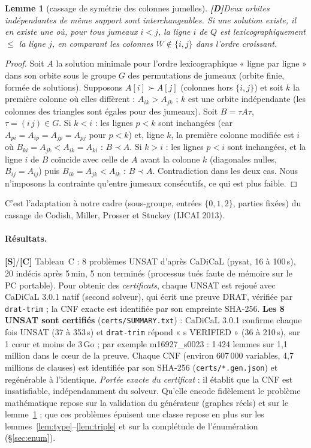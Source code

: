 \documentclass[11pt,a4paper]{article}
\newtheorem{lemma}[theorem]{Lemme}
\theoremstyle{remark}
\newcommand{\st}[1]{\textbf{[#1]}}
\newcommand{\code}[1]{\texttt{#1}}
\begin{document}
\begin{lemma}[cassage de symétrie des colonnes jumelles] \st{D}\label{lem:lex}
Deux orbites indépendantes de même support sont interchangeables. Si une solution existe, il en existe une où, pour tous jumeaux $i<j$,
la ligne $i$ de $Q$ est lexicographiquement $\le$ la ligne $j$, en comparant les colonnes $W\notin\{i,j\}$ dans l'ordre croissant.
\end{lemma}
\begin{proof}
Soit $A$ la solution minimale pour l'ordre lexicographique « ligne par ligne » dans son orbite sous le groupe $G$ des permutations de jumeaux
(orbite finie, formée de solutions). Supposons $A[i]\succ A[j]$ (colonnes hors $\{i,j\}$) et soit $k$ la première colonne où elles diffèrent :
$A_{ik}>A_{jk}$ ; $k$ est une orbite indépendante (les colonnes des triangles sont égales pour des jumeaux). Soit $B=\tau A\tau$, $\tau=(i\,j)\in G$.
Si $k<i$ : les lignes $p<k$ sont inchangées (car $A_{pi}=A_{ip}=A_{jp}=A_{pj}$ pour $p<k$) et, ligne $k$, la première colonne modifiée est $i$ où
$B_{ki}=A_{jk}<A_{ik}=A_{ki}$ : $B\prec A$. Si $k>i$ : les lignes $p<i$ sont inchangées, et la ligne $i$ de $B$ coïncide avec celle de $A$ avant la colonne $k$
(diagonales nulles, $B_{ij}=A_{ij}$) puis $B_{ik}=A_{jk}<A_{ik}$ : $B\prec A$. Contradiction dans les deux cas.
Nous n'imposons la contrainte qu'entre jumeaux consécutifs, ce qui est plus faible.
\end{proof}
C'est l'adaptation à notre cadre (sous-groupe, entrées $\{0,1,2\}$, parties fixées) du cassage de Codish, Miller, Prosser et Stuckey (IJCAI 2013).

\paragraph{Résultats.} \st{S}/\st{C} Tableau~C : 8 problèmes UNSAT d'après CaDiCaL (pysat, 16 à 100\,s), 20 indécis après 5\,min, 5 non terminés
(processus tués faute de mémoire sur le PC portable). Pour obtenir des \emph{certificats}, chaque UNSAT est rejoué avec CaDiCaL 3.0.1 natif (second solveur),
qui écrit une preuve DRAT, vérifiée par \code{drat-trim} ; la CNF exacte est identifiée par son empreinte SHA-256.
\textbf{Les 8 UNSAT sont certifiés} (\code{certs/SUMMARY.txt}) : CaDiCaL 3.0.1 confirme chaque fois UNSAT (37 à 353\,s) et \code{drat-trim} répond
« s VERIFIED » (36 à 210\,s), sur 1 cœur et moins de 3\,Go ; par exemple m16927\_s0023 : 1\,424 lemmes sur 1,1 million dans le cœur de la preuve.
Chaque CNF (environ 607\,000 variables, 4,7 millions de clauses) est identifiée par son SHA-256 (\code{certs/*.gen.json}) et regénérable à l'identique.
\emph{Portée exacte du certificat} : il établit que la CNF est insatisfiable, indépendamment du solveur. Qu'elle encode fidèlement le problème mathématique
repose sur la validation du générateur (graphes réels) et sur le lemme~\ref{lem:lex} ; que ces problèmes épuisent une classe repose en plus sur les
lemmes~\ref{lem:type}--\ref{lem:triple} et sur la complétude de l'énumération (§\ref{sec:enum}).
\end{document}
